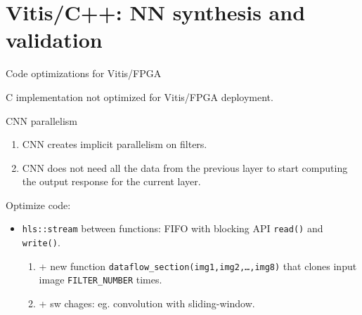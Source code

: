 \documentclass[10pt, xcolor=dvipsnames, compress]{beamer}
\begin{document}
\section[Vitis/C++]{Vitis/C++: NN synthesis and validation}


\begin{frame}{Code optimizations for Vitis/FPGA}

    C implementation not optimized for Vitis/FPGA deployment.
    \vspace{1.5ex}


    \begin{block}{CNN parallelism}
        \begin{enumerate}
            \item CNN creates implicit parallelism on filters.
            \item CNN does not need all the data from the previous layer to start
            computing the output response for the current layer.
        \end{enumerate}

    \end{block}


    \vspace{1.5ex}


    Optimize code:
    \begin{itemize}
        \item \texttt{hls::stream} \cite{stream} between functions:
        FIFO with blocking API \texttt{read()} and \texttt{write()}.\\
        \begin{enumerate}
            \item + new function \texttt{dataflow\_section(img1,img2,\dots,img8)}
            that clones input image \texttt{FILTER\_NUMBER} times.
            \item + sw chages: eg. convolution with sliding-window.
        \end{enumerate}

    \end{itemize}

\end{frame}
\end{document}
